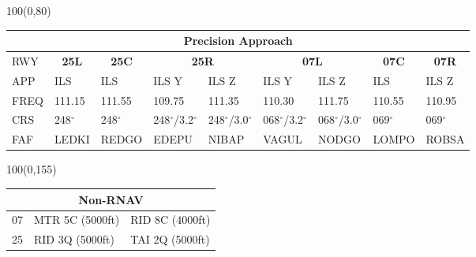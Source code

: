 \documentclass[10pt,landscape,a4paper]{article}
\begin{document}
\begin{textblock}{100}(0,80)
\begin{table}[]
\begin{tabular}{|l|l|l|l|l|l|l|l|l|}
\multicolumn{9}{c}{\textbf{Precision Approach}}                                                                                                                                                                            \\ \hline
RWY  & \multicolumn{1}{c|}{\textbf{25L}} & \multicolumn{1}{c|}{\textbf{25C}} & \multicolumn{2}{c|}{\textbf{25R}} & \multicolumn{2}{c|}{\textbf{07L}} & \multicolumn{1}{c|}{\textbf{07C}} & \multicolumn{1}{c|}{\textbf{07R}} \\ \hline
APP  & ILS                               & ILS                               & ILS Y           & ILS Z           & ILS Y           & ILS Z           & ILS                               & ILS Z                             \\
FREQ & 111.15                            & 111.55                            & 109.75          & 111.35          & 110.30          & 111.75          & 110.55                            & 110.95                            \\
CRS  & 248$^\circ$                              & 248$^\circ$                              & 248$^\circ$/3.2$^\circ$       & 248$^\circ$/3.0$^\circ$       & 068$^\circ$/3.2$^\circ$       & 068$^\circ$/3.0$^\circ$       & 069$^\circ$                              & 069$^\circ$                              \\
FAF  & LEDKI                             & REDGO                             & EDEPU           & NIBAP           & VAGUL           & NODGO           & LOMPO                             & ROBSA                             \\ \hline
\end{tabular}
\end{table}
\end{textblock}



\begin{textblock}{100}(0,155)
\begin{table}[]
\begin{tabular}{|l|l|l|}
\multicolumn{3}{c}{\textbf{Non-RNAV}} \\ \hline
07  & MTR 5C (5000ft)    & RID 8C (4000ft)   \\ \hline
25  & RID 3Q (5000ft)    & TAI 2Q (5000ft)   \\ \hline
\end{tabular}
\end{table}
\end{textblock}
\end{document}
